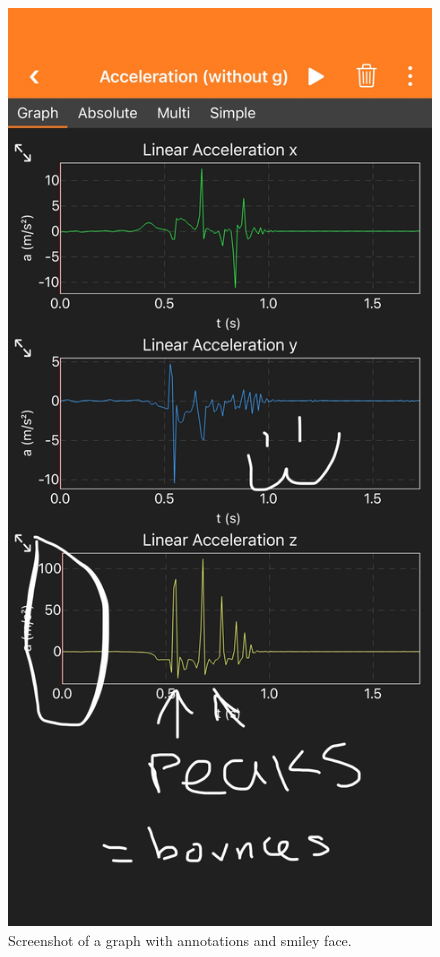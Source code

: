 \documentclass[idxtotoc,hyperref,openany]{labbook} %
\begin{document}
\begin{figure}[H] %
\begin{center}
\includegraphics[width=.7\linewidth]{images/Lab.02/Annotated.jpg}
\end{center}
\caption{Screenshot of a graph with annotations and smiley face.}
\label{fig:Lab02-Annotated}
\end{figure}
\end{document}
